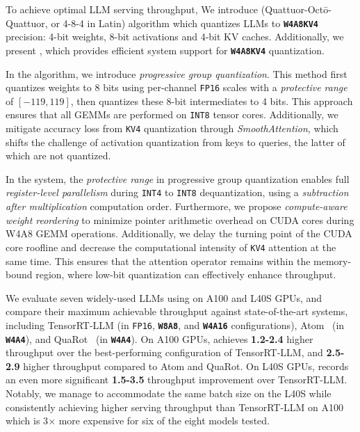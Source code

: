 To achieve optimal LLM serving throughput, We introduce \algo (Quattuor-Octō-Quattuor, or 4-8-4 in Latin) algorithm which quantizes LLMs to \textbf{\texttt{W4A8KV4}} precision: 4-bit weights, 8-bit activations and 4-bit KV caches. Additionally, we present \system, which provides efficient system support for \textbf{\texttt{W4A8KV4}} quantization. 

In the \algo algorithm, we introduce \textit{progressive group quantization}. This method first quantizes weights to 8 bits using per-channel \texttt{FP16} scales with a \textit{protective range} of $[-119, 119]$, then quantizes these 8-bit intermediates to 4 bits. This approach ensures that all GEMMs are performed on \texttt{INT8} tensor cores. Additionally, we mitigate accuracy loss from \texttt{KV4} quantization through \textit{SmoothAttention}, which shifts the challenge of activation quantization from keys to queries, the latter of which are not quantized. 

In the \system system, the \textit{protective range} in progressive group quantization enables full \textit{register-level parallelism} during \texttt{INT4} to \texttt{INT8} dequantization, using a \textit{subtraction after multiplication} computation order. Furthermore, we propose \textit{compute-aware weight reordering} to minimize pointer arithmetic overhead on CUDA cores during W4A8 GEMM operations. Additionally, we delay the turning point of the CUDA core roofline and decrease the computational intensity of \texttt{KV4} attention at the same time. This ensures that the attention operator remains within the memory-bound region, where low-bit quantization can effectively enhance throughput.

We evaluate seven widely-used LLMs using \system on A100 and L40S GPUs, and compare their maximum achievable throughput against state-of-the-art systems, including TensorRT-LLM (in \texttt{FP16}, \textbf{\texttt{W8A8}}, and \textbf{\texttt{W4A16}} configurations), Atom~\cite{zhao2023atom} (in \textbf{\texttt{W4A4}}), and QuaRot~\cite{ashkboos2024quarot} (in \textbf{\texttt{W4A4}}). On A100 GPUs, \system achieves \textbf{1.2-2.4\x} higher throughput over the best-performing configuration of TensorRT-LLM, and \textbf{2.5-2.9\x} higher throughput compared to Atom and QuaRot. On L40S GPUs, \system records an even more significant \textbf{1.5-3.5\x} throughput improvement over TensorRT-LLM. Notably, we manage to accommodate the same batch size on the L40S while consistently achieving higher serving throughput than TensorRT-LLM on A100 which is 3$\times$ more expensive for six of the eight models tested.




